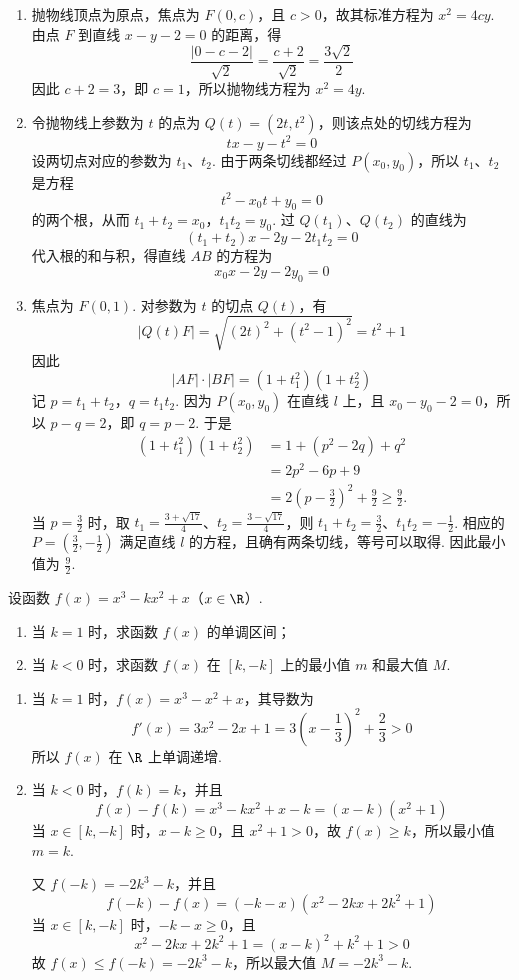 \begin{solution}
\begin{enumerate}
\item
抛物线顶点为原点，焦点为 \(F(0,c)\)，且 \(c>0\)，故其标准方程为 \(x^2=4cy\). 由点 \(F\) 到直线 \(x-y-2=0\) 的距离，得
\[
\frac{|0-c-2|}{\sqrt2}=\frac{c+2}{\sqrt2}=\frac{3\sqrt2}{2}
\]
因此 \(c+2=3\)，即 \(c=1\)，所以抛物线方程为 \(x^2=4y\).

\item
令抛物线上参数为 \(t\) 的点为 \(Q(t)=(2t,t^2)\)，则该点处的切线方程为
\[
tx-y-t^2=0
\]
设两切点对应的参数为 \(t_1\)、\(t_2\). 由于两条切线都经过 \(P(x_0,y_0)\)，所以 \(t_1\)、\(t_2\) 是方程
\[
t^2-x_0t+y_0=0
\]
的两个根，从而 \(t_1+t_2=x_0\)，\(t_1t_2=y_0\). 过 \(Q(t_1)\)、\(Q(t_2)\) 的直线为
\[
(t_1+t_2)x-2y-2t_1t_2=0
\]
代入根的和与积，得直线 \(AB\) 的方程为
\[
x_0x-2y-2y_0=0
\]

\item
焦点为 \(F(0,1)\). 对参数为 \(t\) 的切点 \(Q(t)\)，有
\[
|Q(t)F|=\sqrt{(2t)^2+(t^2-1)^2}=t^2+1
\]
因此
\[
|AF|\cdot|BF|=(1+t_1^2)(1+t_2^2)
\]
记 \(p=t_1+t_2\)，\(q=t_1t_2\). 因为 \(P(x_0,y_0)\) 在直线 \(l\) 上，且 \(x_0-y_0-2=0\)，所以 \(p-q=2\)，即 \(q=p-2\). 于是
\[
\begin{aligned}
(1+t_1^2)(1+t_2^2)
&=1+(p^2-2q)+q^2\\
&=2p^2-6p+9\\
&=2\left(p-\frac32\right)^2+\frac92\geq\frac92.
\end{aligned}
\]
当 \(p=\frac32\) 时，取 \(t_1=\frac{3+\sqrt{17}}4\)、\(t_2=\frac{3-\sqrt{17}}4\)，则 \(t_1+t_2=\frac32\)、\(t_1t_2=-\frac12\). 相应的 \(P=(\frac32,-\frac12)\) 满足直线 \(l\) 的方程，且确有两条切线，等号可以取得. 因此最小值为 \(\frac92\).
\end{enumerate}
\end{solution}

\begin{problem}
设函数 \( f(x) = x^3 - kx^2 + x  \)（\(x \in \R\)）.
\begin{enumerate}
\item 当 \(k = 1\) 时，求函数 \(f(x)\) 的单调区间；
\item 当 \(k < 0\) 时，求函数 \(f(x)\) 在 \([k, -k]\) 上的最小值 \(m\) 和最大值 \(M\).
\end{enumerate}
\end{problem}

\begin{solution}
\begin{enumerate}
\item
当 \(k=1\) 时，\(f(x)=x^3-x^2+x\)，其导数为
\[
f'(x)=3x^2-2x+1=3\left(x-\frac13\right)^2+\frac23>0
\]
所以 \(f(x)\) 在 \(\R\) 上单调递增.

\item
当 \(k<0\) 时，\(f(k)=k\)，并且
\[
f(x)-f(k)=x^3-kx^2+x-k=(x-k)(x^2+1)
\]
当 \(x\in[k,-k]\) 时，\(x-k\geq0\)，且 \(x^2+1>0\)，故 \(f(x)\geq k\)，所以最小值 \(m=k\).

又 \(f(-k)=-2k^3-k\)，并且
\[
f(-k)-f(x)=(-k-x)(x^2-2kx+2k^2+1)
\]
当 \(x\in[k,-k]\) 时，\(-k-x\geq0\)，且
\[
x^2-2kx+2k^2+1=(x-k)^2+k^2+1>0
\]
故 \(f(x)\leq f(-k)=-2k^3-k\)，所以最大值 \(M=-2k^3-k\).
\end{enumerate}
\end{solution}
